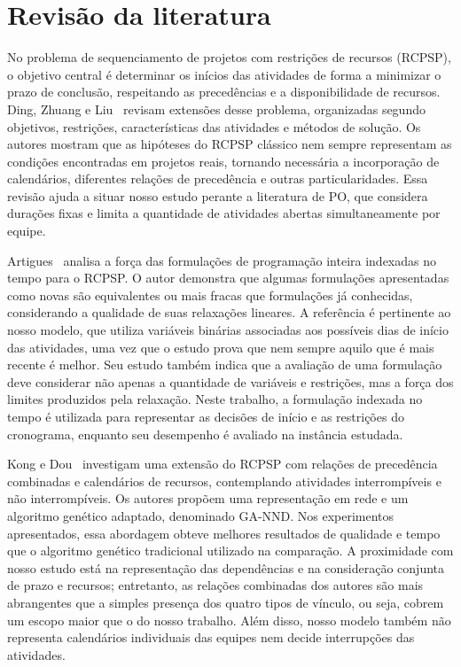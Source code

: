 
\section{Revisão da literatura}
\label{sec:literatura}

No problema de sequenciamento de projetos com restrições de recursos
(RCPSP), o objetivo central é determinar os inícios das atividades de forma a minimizar
o prazo de conclusão, respeitando as precedências e a disponibilidade de
recursos. Ding, Zhuang e Liu~\cite{ding2023extensions} revisam extensões
desse problema, organizadas segundo objetivos, restrições, características
das atividades e métodos de solução. Os autores mostram que as hipóteses
do RCPSP clássico nem sempre representam as condições encontradas em
projetos reais, tornando necessária a incorporação de calendários, diferentes
relações de precedência e outras particularidades. Essa revisão ajuda a
situar nosso estudo perante a literatura de PO, que considera durações fixas e limita a quantidade de
atividades abertas simultaneamente por equipe.

Artigues~\cite{artigues2017} analisa a força das formulações de programação
inteira indexadas no tempo para o RCPSP. O autor demonstra que algumas
formulações apresentadas como novas são equivalentes ou mais fracas que
formulações já conhecidas, considerando a qualidade de suas relaxações
lineares. A referência é pertinente ao nosso modelo, que utiliza variáveis
binárias associadas aos possíveis dias de início das atividades, uma vez que o estudo prova que nem sempre aquilo que é mais recente é melhor. Seu estudo
também indica que a avaliação de uma formulação deve considerar não apenas
a quantidade de variáveis e restrições, mas a força dos limites produzidos
pela relaxação. Neste trabalho, a formulação indexada no tempo é utilizada
para representar as decisões de início e as restrições do cronograma,
enquanto seu desempenho é avaliado na instância estudada.

Kong e Dou~\cite{kongdou2020} investigam uma extensão do RCPSP com relações
de precedência combinadas e calendários de recursos, contemplando
atividades interrompíveis e não interrompíveis. Os autores propõem uma
representação em rede e um algoritmo genético adaptado, denominado GA-NND.
Nos experimentos apresentados, essa abordagem obteve melhores resultados
de qualidade e tempo que o algoritmo genético tradicional utilizado na
comparação. A proximidade com nosso estudo está na representação das
dependências e na consideração conjunta de prazo e recursos; entretanto,
as relações combinadas dos autores são mais abrangentes que a simples
presença dos quatro tipos de vínculo, ou seja, cobrem um escopo maior que o do nosso trabalho. Além disso, nosso modelo também não representa
calendários individuais das equipes nem decide interrupções das atividades.

